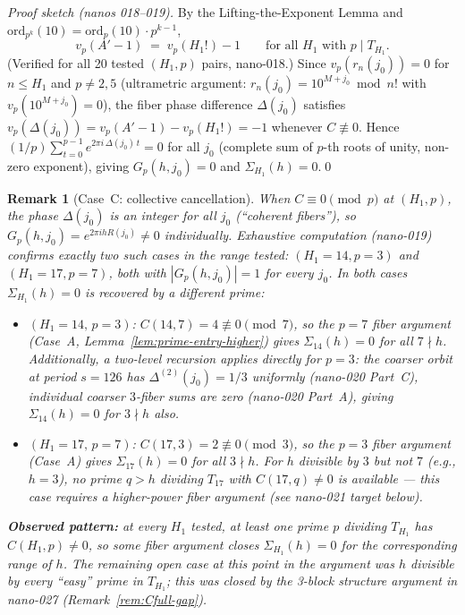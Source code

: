 \documentclass[
]{article}
\newtheorem{remark}[theorem]{Remark}
\begin{document}
\begin{proof}[Proof sketch (nanos 018--019)]
By the Lifting-the-Exponent Lemma and $\mathrm{ord}_{p^k}(10)=\mathrm{ord}_p(10)\cdot p^{k-1}$,
\[
  v_p(A'-1) \;=\; v_p(H_1!) - 1 \qquad\text{for all $H_1$ with $p\mid T_{H_1}$}.
\]
(Verified for all 20 tested $(H_1,p)$ pairs, nano-018.)
Since $v_p(r_n(j_0))=0$ for $n\leq H_1$ and $p\ne 2,5$ (ultrametric argument:
$r_n(j_0)=10^{M+j_0}\bmod n!$ with $v_p(10^{M+j_0})=0$),
the fiber phase difference $\Delta(j_0)$ satisfies $v_p(\Delta(j_0))=v_p(A'-1)-v_p(H_1!)=-1$
whenever $C\not\equiv 0$.
Hence $(1/p)\sum_{t=0}^{p-1}e^{2\pi i\,\Delta(j_0)\,t}=0$ for all $j_0$
(complete sum of $p$-th roots of unity, non-zero exponent), giving
$G_p(h,j_0)=0$ and $\Sigma_{H_1}(h)=0$.\qed
\end{proof}

\begin{remark}[Case~C: collective cancellation]\label{rem:case-C}
When $C\equiv 0\pmod p$ at $(H_1,p)$, the phase $\Delta(j_0)$ is an
integer for all $j_0$ (``coherent fibers''), so $G_p(h,j_0)=e^{2\pi ih R(j_0)}\ne 0$
individually.
Exhaustive computation (nano-019) confirms exactly two such cases in the range
tested: $(H_1=14,p=3)$ and $(H_1=17,p=7)$, both with $|G_p(h,j_0)|=1$ for
every $j_0$.
In both cases $\Sigma_{H_1}(h)=0$ is recovered by a different prime:
\begin{itemize}
\item $(H_1=14,\,p=3)$: $C(14,7)=4\not\equiv 0\pmod 7$, so the $p=7$
  fiber argument (Case~A, Lemma~\ref{lem:prime-entry-higher}) gives
  $\Sigma_{14}(h)=0$ for all $7\nmid h$.
  Additionally, a two-level recursion applies directly for $p=3$:
  the coarser orbit at period $s=126$ has $\Delta^{(2)}(j_0)=1/3$ uniformly
  (nano-020 Part~C), individual coarser $3$-fiber sums are zero
  (nano-020 Part~A), giving $\Sigma_{14}(h)=0$ for $3\nmid h$ also.
\item $(H_1=17,\,p=7)$: $C(17,3)=2\not\equiv 0\pmod 3$, so the $p=3$
  fiber argument (Case~A) gives $\Sigma_{17}(h)=0$ for all $3\nmid h$.
  For $h$ divisible by $3$ but not $7$ (e.g., $h=3$), no prime $q>h$
  dividing $T_{17}$ with $C(17,q)\ne 0$ is available --- this case
  requires a \emph{higher-power fiber} argument (see nano-021 target below).
\end{itemize}
\textbf{Observed pattern:} at every $H_1$ tested, at least one prime $p$ dividing
$T_{H_1}$ has $C(H_1,p)\ne 0$, so some fiber argument closes $\Sigma_{H_1}(h)=0$
for the corresponding range of $h$.
The remaining open case at this point in the argument was $h$ divisible
by every ``easy'' prime in $T_{H_1}$; this was closed by the 3-block
structure argument in nano-027 (Remark~\ref{rem:Cfull-gap}).
\end{remark}
\end{document}
